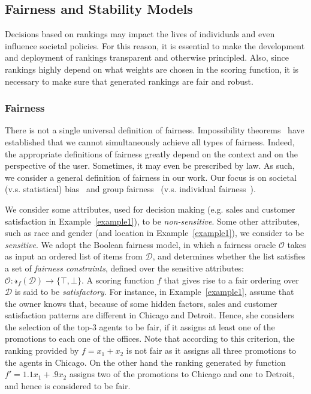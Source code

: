 \subsection{Fairness and Stability Models}\label{sec:defs} %
Decisions based on rankings may impact the lives of individuals and even influence societal policies. For this reason, it is essential to  make the development and deployment of rankings transparent and otherwise principled.
Also, since rankings highly depend on what weights are chosen in the scoring function, it is necessary to make sure that generated rankings are fair and robust.

\subsubsection{Fairness}
There is not a single universal definition of fairness.  
Impossibility theorems~\cite{friedler2016possibility} have established that we cannot simultaneously achieve all types of fairness.
Indeed, the appropriate definitions of fairness greatly depend on the context and on the perspective of the user. Sometimes, it may even be prescribed by law. 
As such, we consider a general definition of fairness in our work. Our focus is on societal (v.s. statistical) bias~\cite{narayanan2018translation} and group fairness~\cite{hardt2016equality2} (v.s. individual fairness~\cite{dwork2012fairness2}).

We consider some attributes, used for decision making (e.g. sales and customer satisfaction in Example~\ref{example1}), to be {\em non-sensitive}. Some other attributes, such as race and gender (and location in Example~\ref{example1}), we consider to be {\em sensitive}.
We adopt the Boolean fairness model, in which a fairness oracle $\mathcal{O}$ takes as input an ordered list of items from $\mathcal{D}$, and determines whether the list
satisfies a set of {\em fairness constraints}, defined over the sensitive attributes: $\mathcal{O}: \mathcal{r}_f(\mathcal{D}) \rightarrow \{\top, \bot\}$. A scoring function $f$ that gives rise to a fair ordering over  $\mathcal{D}$ is said to be {\em satisfactory}.
For instance, in Example~\ref{example1}, assume that the owner knows that, because of some hidden factors, sales and customer satisfaction patterns are different in Chicago and Detroit. Hence, she considers the selection of the top-3 agents to be fair, if it assigns at least one of the promotions to each one of the offices. Note that according to this criterion, the ranking provided by $f=x_1+x_2$ is not fair as it assigns all three promotions to the agents in Chicago.
On the other hand the ranking generated by function $f'=1.1x_1+.9x_2$ assigns two of the promotions to Chicago and one to Detroit, and hence is considered to be fair. 


